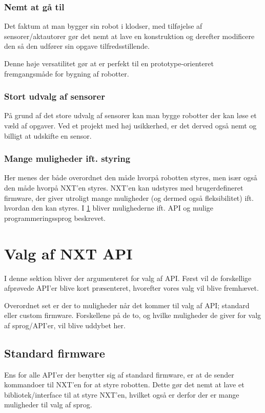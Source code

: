 \subsubsection{Nemt at gå til}
Det faktum at man bygger sin robot i \lego klodser, med tilføjelse af \legoms sensorer/aktautorer gør det nemt at lave en konstruktion og derefter modificere den så den udfører sin opgave tilfredsstillende.

Denne høje versatilitet gør at \lego er perfekt til en prototype-orienteret fremgangsmåde for bygning af robotter.

\subsubsection{Stort udvalg af sensorer}
På grund af det store udvalg af sensorer kan man bygge robotter der kan løse et væld af opgaver.
Ved et projekt med høj usikkerhed, er det derved også nemt og billigt at udskifte en sensor.

\subsubsection{Mange muligheder ift. styring}
Her menes der både overordnet den måde hvorpå robotten styres, men især også den måde hvorpå NXT'en styres.
NXT'en kan udstyres med brugerdefineret firmware, der giver utroligt mange muligheder (og dermed også fleksibilitet) ift. hvordan den kan styres.
I \cref{nxt_api} bliver mulighederne ift. API og mulige programmeringssprog beskrevet.


\section{Valg af NXT API}
\label{nxt_api}

I denne sektion bliver der argumenteret for valg af API.
Først vil de forskellige afprøvede API'er blive kort præsenteret, hvorefter vores valg vil blive fremhævet.

Overordnet set er der to muligheder når det kommer til valg af API; standard eller custom firmware.
Forskellene på de to, og hvilke muligheder de giver for valg af sprog/API'er, vil blive uddybet her.

\subsection{Standard firmware}
Ens for alle API'er der benytter sig af standard firmware, er at de sender kommandoer til NXT'en for at styre robotten. 
Dette gør det nemt at lave et bibliotek/interface til at styre NXT'en, hvilket også er derfor der er mange muligheder til valg af sprog.

